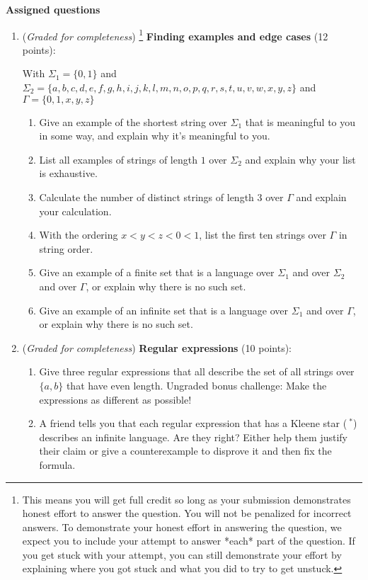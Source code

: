 \documentclass[12pt, oneside]{article}
\newcommand{\gradeComplete}{({\it Graded for completeness}) }
\newcommand{\gradeCompleteFirst}{\gradeComplete\footnote{This means you will 
get full credit so long as your submission demonstrates honest effort to 
answer the question. You will not be penalized for incorrect answers. 
To demonstrate your honest effort in answering the question, we 
expect you to include your attempt to answer *each* part of the question. 
If you get stuck with your attempt, you can still demonstrate 
your effort by explaining where you got stuck and what 
you did to try to get unstuck.} }
\begin{document}
{\bf Assigned questions}
\begin{enumerate}[wide, labelwidth=!, labelindent=0pt]
\item\gradeCompleteFirst \textbf{Finding examples and edge cases} (12 points):

With $\Sigma_1 = \{0,1\}$ and 
$\Sigma_2 = \{a,b,c,d,e,f,g,h,i,j,k,l,m,n,o,p,q,r,s,t,u,v,w,x,y,z\}$
and $\Gamma = \{0,1,x,y,z\}$

    \begin{enumerate}
    \item Give an example of the shortest string over $\Sigma_1$ that is meaningful to you in some way, and explain 
    why it's meaningful to you.

    \item List all examples of strings of length $1$ over $\Sigma_2$ and explain why your list is exhaustive.

    \item Calculate the number of distinct strings of length 3 over $\Gamma$ and explain your calculation.

    \item With the ordering $x < y < z < 0 < 1$, list the first ten strings over $\Gamma$ in string order.

    \item Give an example of a finite set that is a language over $\Sigma_1$ and over $\Sigma_2$ and over $\Gamma$, 
    or explain why there is no such set.
    
    \item  Give an example of an infinite set that is a language over $\Sigma_1$  and over $\Gamma$, 
    or explain why there is no such set.

    \end{enumerate}

\item\gradeComplete \textbf{Regular expressions} (10 points):

    \begin{enumerate}
    \item Give three regular expressions that all describe the set of all strings over $\{a,b\}$ that have 
    even length. Ungraded bonus challenge: Make the expressions as different as possible!

    \item A friend tells you that each regular expression that has a Kleene star ($~^*$) describes an
    infinite language. Are they right? Either help them justify their claim or give a counterexample to disprove it
    and then fix the formula.


\end{enumerate}
\end{enumerate}
\end{document}
